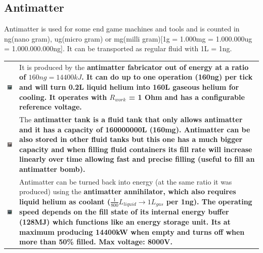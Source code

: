 \documentclass[11pt]{article} %
\makeatletter
\newcommand{\imgtex}{\begin{tabularx}{\textwidth}{@{}c@{ }X@{}}}
\makeatother
\begin{document}
\subsection{Antimatter}
Antimatter is used for some end game machines and tools and is counted in ng(nano gram), ug(micro gram) or mg(milli gram)[1g = 1.000mg = 1.000.000ug = 1.000.000.000ng]. It can be transported as regular fluid with 1L = 1ng. \\
\imgtex
\includegraphics[align = t]{blockAMFabricator} & It is produced by the \bf antimatter fabricator \rm out of energy at a ratio of $160ng = 14400kJ$. It can do up to one operation (160ng) per tick and will turn 0.2L liquid helium into 160L gaseous helium for cooling. It operates with $R_{work}$ = 1 Ohm and has a configurable reference voltage.\\
\includegraphics[align = t]{blockAntimatterTank} & The \bf antimatter tank \rm is a fluid tank that only allows antimatter and it has a capacity of 160000000L (160mg). Antimatter can be also stored in other fluid tanks but this one has a much bigger capacity and when filling fluid containers its fill rate will increase linearly over time allowing fast and precise filling (useful to fill an antimatter bomb). \\
\includegraphics[align = t]{blockAMAnnihilator} & Antimatter can be turned back into energy (at the same ratio it was produced) using the \bf antimatter annihilator\rm, which also requires liquid helium as coolant ($\frac{1}{800}L_{liquid} \rightarrow 1L_{gas}$ per 1ng). The operating speed depends on the fill state of its internal energy buffer (128MJ) which functions like an energy storage unit. Its at maximum producing 14400kW when empty and turns off when more than 50\% filled. Max voltage: 8000V.


\end{tabularx}
\end{document}

